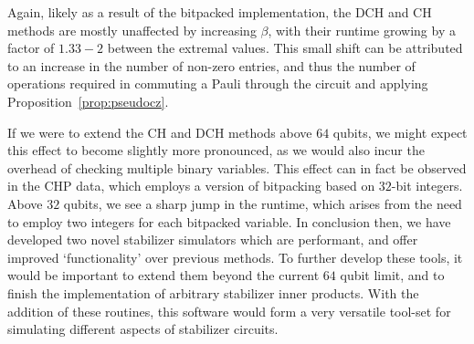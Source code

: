 Again, likely as a result of the bitpacked implementation, the DCH and CH methods are mostly unaffected by increasing $\beta$, with their runtime growing by a factor of $1.33-2$ between the extremal values. This small shift can be attributed to an increase in the number of non-zero entries, and thus the number of operations required in commuting a Pauli through the circuit and applying Proposition~\ref{prop:pseudocz}.\par
If we were to extend the CH and DCH methods above $64$ qubits, we might expect this effect to become slightly more pronounced, as we would also incur the overhead of checking multiple binary variables. This effect can in fact be observed in the CHP data, which employs a version of bitpacking based on $32$-bit integers. Above $32$ qubits, we see a sharp jump in the runtime, which arises from the need to employ two integers for each bitpacked variable.
In conclusion then, we have developed two novel stabilizer simulators which are performant, and offer improved `functionality' over previous methods. To further develop these tools, it would be important to extend them beyond the current $64$ qubit limit, and to finish the implementation of arbitrary stabilizer inner products. With the addition of these routines, this software would form a very versatile tool-set for simulating different aspects of stabilizer circuits.